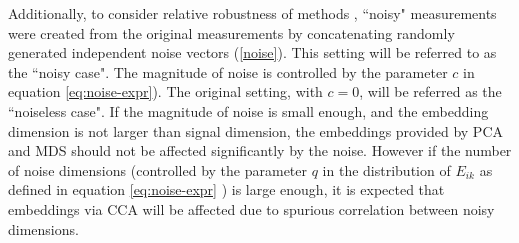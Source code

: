 \documentclass[12pt,oneside,final]{thesis}\usepackage[]{graphicx}\usepackage[]{color}
\begin{document}
 Additionally, to consider  relative robustness of methods , ``noisy" measurements were created from the original measurements by concatenating randomly generated independent noise vectors (\autoref{noise}).   This setting will be referred to as the ``noisy case". The magnitude of noise is controlled by the parameter $c$ in equation \eqref{eq:noise-expr}). The original setting, with $c=0$,  will be referred as the ``noiseless case".
If the magnitude of noise is small enough, and the embedding dimension is not larger than signal dimension, the embeddings provided by PCA and MDS should not be affected significantly by the noise. However  if the number of noise dimensions (controlled by the parameter $q$ in the distribution of $E_{ik}$ as defined in equation \eqref{eq:noise-expr} ) is large enough, it is expected that embeddings via  CCA  will  be affected due to spurious correlation between noisy dimensions.
\end{document}
